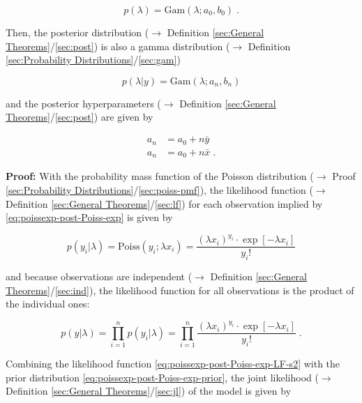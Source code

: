 \documentclass[a4paper,12pt,twoside]{book}
\begin{document}
\begin{equation} \label{eq:poissexp-post-Poiss-exp-prior}
p(\lambda) = \mathrm{Gam}(\lambda; a_0, b_0) \; .
\end{equation}

Then, the posterior distribution ($\rightarrow$ Definition \ref{sec:General Theorems}/\ref{sec:post}) is also a gamma distribution ($\rightarrow$ Definition \ref{sec:Probability Distributions}/\ref{sec:gam})

\begin{equation} \label{eq:poissexp-post-Poiss-exp-post}
p(\lambda|y) = \mathrm{Gam}(\lambda; a_n, b_n)
\end{equation}

and the posterior hyperparameters ($\rightarrow$ Definition \ref{sec:General Theorems}/\ref{sec:post}) are given by

\begin{equation} \label{eq:poissexp-post-Poiss-exp-post-par}
\begin{split}
a_n &= a_0 + n \bar{y} \\
a_n &= a_0 + n \bar{x} \; .
\end{split}
\end{equation}


\vspace{1em}
\textbf{Proof:} With the probability mass function of the Poisson distribution ($\rightarrow$ Proof \ref{sec:Probability Distributions}/\ref{sec:poiss-pmf}), the likelihood function ($\rightarrow$ Definition \ref{sec:General Theorems}/\ref{sec:lf}) for each observation implied by \eqref{eq:poissexp-post-Poiss-exp} is given by

\begin{equation} \label{eq:poissexp-post-Poiss-exp-LF-s1}
p(y_i|\lambda) = \mathrm{Poiss}(y_i; \lambda x_i) = \frac{(\lambda x_i)^{y_i} \cdot \exp\left[-\lambda x_i\right]}{y_i !}
\end{equation}

and because observations are independent ($\rightarrow$ Definition \ref{sec:General Theorems}/\ref{sec:ind}), the likelihood function for all observations is the product of the individual ones:

\begin{equation} \label{eq:poissexp-post-Poiss-exp-LF-s2}
p(y|\lambda) = \prod_{i=1}^n p(y_i|\lambda) = \prod_{i=1}^n \frac{(\lambda x_i)^{y_i} \cdot \exp\left[-\lambda x_i\right]}{y_i !} \; .
\end{equation}

Combining the likelihood function \eqref{eq:poissexp-post-Poiss-exp-LF-s2} with the prior distribution \eqref{eq:poissexp-post-Poiss-exp-prior}, the joint likelihood ($\rightarrow$ Definition \ref{sec:General Theorems}/\ref{sec:jl}) of the model is given by
\end{document}
